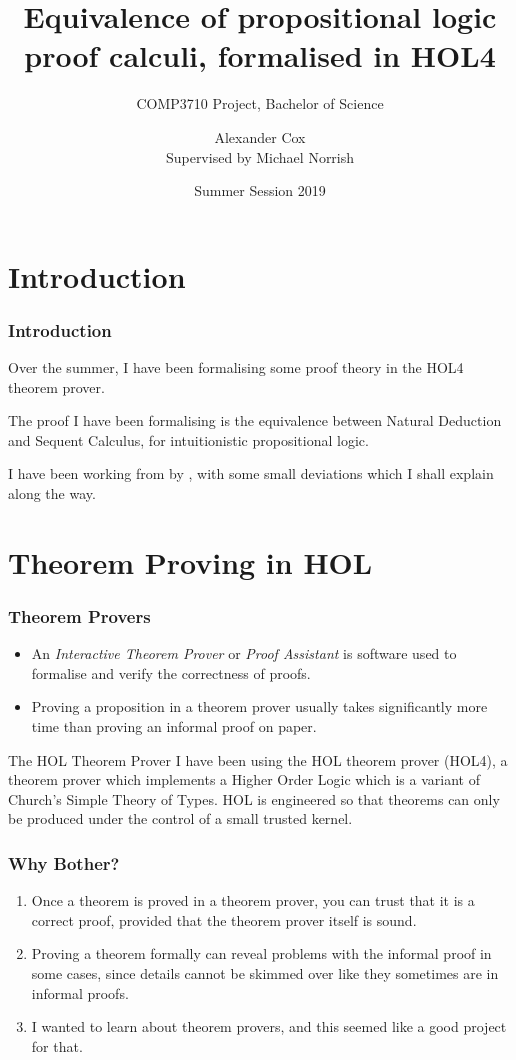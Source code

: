 \documentclass[english,svgnames,hide notes,12pt]{beamer}
\title[Equivalence of calculi in HOL4]{Equivalence of propositional logic proof calculi, formalised in HOL4}
\subtitle{COMP3710 Project, Bachelor of Science}
\author[Alexander Cox]{\large Alexander Cox\\ \small Supervised by Michael Norrish}
\institute[ANU]{The Australian National University}
\date[Summer 2019]{Summer Session 2019}
\theoremstyle{definition}
\theoremstyle{remark}
\begin{document}
\begin{frame}[plain]
    \titlepage{}
\end{frame}

\section{Introduction}

\begin{frame}
    \frametitle{Introduction}
    Over the summer, I have been formalising some proof theory in the HOL4 theorem prover.

    \bigskip
    The proof I have been formalising is the equivalence between Natural Deduction and Sequent Calculus, for intuitionistic propositional logic.

    \bigskip
    I have been working from  by \citeauthor{bpt}, with some small deviations which I shall explain along the way.
\end{frame}

\section{Theorem Proving in HOL}

\begin{frame}
    \frametitle{Theorem Provers}
    \begin{itemize}
        \item An \emph{Interactive Theorem Prover} or \emph{Proof Assistant} is software used to formalise and verify the correctness of proofs.
        \item Proving a proposition in a theorem prover usually takes significantly more time than proving an informal proof on paper.
    \end{itemize}
\end{frame}

\begin{frame}{The HOL Theorem Prover}
  I have been using the HOL theorem prover (HOL4), a theorem prover which implements a Higher Order Logic which is a variant of Church's Simple Theory of Types.
  HOL is engineered so that theorems can only be produced under the control of a small trusted kernel.
\end{frame}

\begin{frame}
    \frametitle{Why Bother?}
    \begin{enumerate}
        \item Once a theorem is proved in a theorem prover, you can trust that it is a correct proof, provided that the theorem prover itself is sound.
        \item Proving a theorem formally can reveal problems with the informal proof in some cases, since details cannot be skimmed over like they sometimes are in informal proofs.
        \item I wanted to learn about theorem provers, and this seemed like a good project for that.
    \end{enumerate}
\end{frame}
\end{document}
